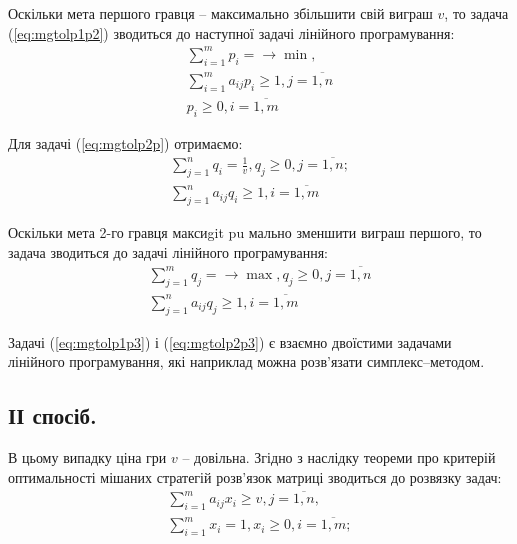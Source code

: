 \documentclass[12pt,a4paper]{book}
\begin{document}
Оскільки мета першого гравця – максимально збільшити свій виграш $v$, то задача (\ref{eq:mgtolp1p2}) зводиться до наступної задачі лінійного програмування:
\begin{equation}
\begin{array}{l}
\displaystyle \sum_{i=1}^m p_i = \to \min,\\
\displaystyle \sum_{i=1}^m a_{ij} p_i \geq 1,  j=\overline{1,n}\\
p_i \geq 0, i=\overline{1,m}
\end{array}
\label{eq:mgtolp1p3}
\end{equation}

Для задачі (\ref{eq:mgtolp2p}) отримаємо:
\begin{equation}
\begin{array}{l}
\displaystyle \sum_{j=1}^n q_i = \frac{1}{v}, q_j \geq 0, j=\overline{1,n};\\
\displaystyle \sum_{j=1}^n a_{ij} q_i \geq 1,  i=\overline{1,m}
\end{array}
\label{eq:mgtolp2p2}
\end{equation}

Оскільки мета 2-го гравця максиgit pu	мально зменшити виграш першого, то задача зводиться до задачі лінійного програмування:
\begin{equation}
\begin{array}{l}
\displaystyle \sum_{j=1}^m q_j = \to \max, q_j \geq 0, j=\overline{1,n}\\
\displaystyle \sum_{j=1}^n a_{ij} q_j \geq 1,  i=\overline{1,m}
\end{array}
\label{eq:mgtolp2p3}
\end{equation}

Задачі (\ref{eq:mgtolp1p3}) і (\ref{eq:mgtolp2p3}) є взаємно двоїстими задачами лінійного програмування, які наприклад можна розв’язати симплекс–методом.

\subsection{ІІ спосіб.}

В цьому випадку ціна гри $v$ – довільна. Згідно з наслідку теореми про критерій оптимальності мішаних стратегій розв’язок матриці зводиться до розвязку задач:
\begin{equation}
\begin{array}{l}
\displaystyle \sum_{i=1}^m a_{ij} x_i \geq v,  j=\overline{1,n},\\
\displaystyle \sum_{i=1}^m x_i = 1, x_i \geq 0, i=\overline{1,m};
\end{array}
\label{eq:mgtolp2w1p}
\end{equation}
\end{document}
